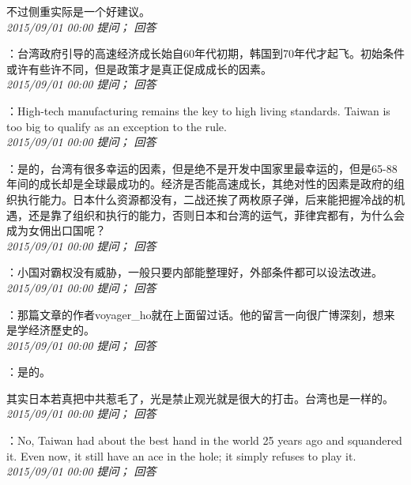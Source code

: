 \documentclass[twocolumn]{ctexart}
\begin{document}
不过侧重实际是一个好建议。\\

\textit{\hfill\noindent\small 2015/09/01 00:00 提问； 回答}

：台湾政府引导的高速经济成长始自60年代初期，韩国到70年代才起飞。初始条件或许有些许不同，但是政策才是真正促成成长的因素。\\

\textit{\hfill\noindent\small 2015/09/01 00:00 提问； 回答}

：High-tech manufacturing remains the key to high living standards. Taiwan is too big to qualify as an exception to the rule.\\

\textit{\hfill\noindent\small 2015/09/01 00:00 提问； 回答}

：是的，台湾有很多幸运的因素，但是绝不是开发中国家里最幸运的，但是65-88年间的成长却是全球最成功的。经济是否能高速成长，其绝对性的因素是政府的组织执行能力。日本什么资源都没有，二战还挨了两枚原子弹，后来能把握冷战的机遇，还是靠了组织和执行的能力，否则日本和台湾的运气，菲律宾都有，为什么会成为女佣出口国呢？\\

\textit{\hfill\noindent\small 2015/09/01 00:00 提问； 回答}

：小国对霸权没有威胁，一般只要内部能整理好，外部条件都可以设法改进。\\

\textit{\hfill\noindent\small 2015/09/01 00:00 提问； 回答}

：那篇文章的作者voyager\_ho就在上面留过话。他的留言一向很广博深刻，想来是学经济歷史的。\\

\textit{\hfill\noindent\small 2015/09/01 00:00 提问； 回答}

：是的。

其实日本若真把中共惹毛了，光是禁止观光就是很大的打击。台湾也是一样的。\\

\textit{\hfill\noindent\small 2015/09/01 00:00 提问； 回答}

：No, Taiwan had about the best hand in the world 25 years ago and squandered it. Even now, it still have an ace in the hole; it simply refuses to play it.\\

\textit{\hfill\noindent\small 2015/09/01 00:00 提问； 回答}
\end{document}
